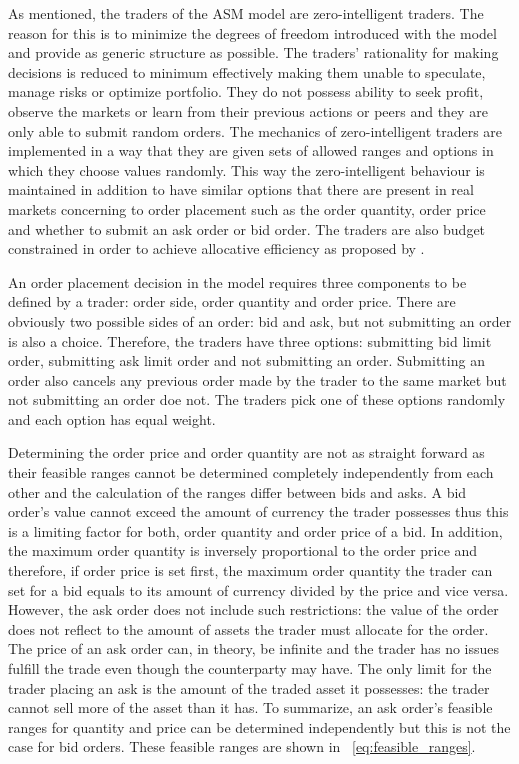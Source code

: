 As mentioned, the traders of the ASM model are zero-intelligent
traders. The reason for this is to minimize the degrees of freedom introduced with
the model and provide as generic structure as possible. The traders' rationality 
for making decisions is reduced to minimum effectively making them unable to speculate, 
manage risks or optimize portfolio. They do not possess ability to seek profit, 
observe the markets or learn from their previous actions or peers and
they are only able to submit random orders. The mechanics of zero-intelligent traders
are implemented in a way that they are given sets of allowed ranges 
and options in which they choose values randomly. This way the zero-intelligent behaviour is maintained
in addition to have similar options that there are present in real markets 
concerning to order placement such as the order quantity, order price and whether
to submit an ask order or bid order. The traders are also budget constrained
in order to achieve allocative efficiency as proposed by
\citet{God93}.


An order placement decision in the model requires three components 
to be defined by a trader: order side, order quantity and order price. 
There are obviously two possible sides of an order: bid and ask, but
not submitting an order is also a choice. Therefore, the traders
have three options: submitting bid limit order, submitting ask limit order
and not submitting an order. Submitting an order also cancels any previous
order made by the trader to the same market but not submitting an order doe not. 
The traders pick one of these options randomly and each option has equal weight. 

Determining the order price and order quantity are not as straight
forward as their feasible ranges cannot be determined completely independently
from each other and the calculation of the ranges differ between bids and asks. A bid order's
value cannot exceed the amount of currency the trader possesses thus this is 
a limiting factor for both, order quantity and order price of a bid. In addition,
the maximum order quantity is inversely proportional to the order price and
therefore, if order price is set first, the maximum order quantity the trader
can set for a bid equals to its amount of currency divided by the price and vice versa. 
However, the ask order does not include such restrictions: the value of the order
does not reflect to the amount of assets the trader must allocate for the order. The
price of an ask order can, in theory, be infinite and the trader has no issues
fulfill the trade even though the counterparty may have. The only limit for the
trader placing an ask is the amount of the traded asset it possesses: the trader
cannot sell more of the asset than it has. To summarize, an ask order's feasible
ranges for quantity and price can be determined independently but this is not the
case for bid orders. These feasible ranges are shown in ~\ref{eq:feasible_ranges}.

